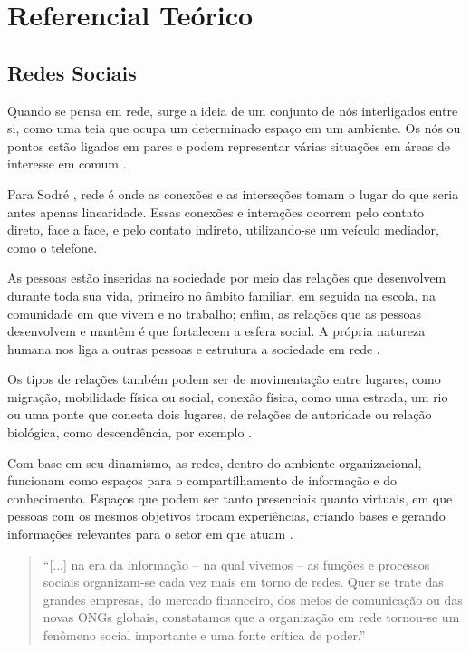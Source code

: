 \chapter{Referencial Teórico}

\section{Redes Sociais}

Quando se pensa em rede, surge a ideia de um conjunto de nós interligados entre si, como uma teia que ocupa um determinado espaço em um ambiente. Os nós ou pontos estão ligados em pares e podem representar várias situações em áreas de interesse em comum \cite{Newman:2010}.

Para Sodré \cite{Sodre:2002}, rede é onde as conexões e as interseções tomam o lugar do que seria antes apenas linearidade. Essas conexões e interações ocorrem pelo contato direto, face a face, e pelo contato indireto, utilizando-se um veículo mediador, como o telefone.

As pessoas estão inseridas na sociedade por meio das relações que desenvolvem durante toda sua vida, primeiro no âmbito familiar, em seguida na escola, na comunidade em que vivem e no trabalho; enfim, as relações que as pessoas desenvolvem e mantêm é que fortalecem a esfera social. A própria natureza humana nos liga a outras pessoas e estrutura a sociedade em rede \cite{Tomae:Alcara:Chiara:2005}.

Os tipos de relações também podem ser de movimentação entre lugares, como migração, mobilidade física ou social, conexão física, como uma estrada, um rio ou uma ponte que conecta dois lugares, de relações de autoridade ou relação biológica, como descendência, por exemplo \cite{Wasserman:1994}.

Com base em seu dinamismo, as redes, dentro do ambiente organizacional, funcionam como espaços para o compartilhamento de informação e do conhecimento. Espaços que podem ser tanto presenciais quanto virtuais, em que pessoas com os mesmos objetivos trocam experiências, criando bases e gerando informações relevantes para o setor em que atuam \cite{Tomae:Alcara:Chiara:2005}.

\begin{quote}
	``[...] na era da informação – na qual vivemos – as
	funções e processos sociais organizam-se cada vez
	mais em torno de redes. Quer se trate das grandes
	empresas, do mercado financeiro, dos meios de
	comunicação ou das novas ONGs globais,
	constatamos que a organização em rede tornou-se
	um fenômeno social importante e uma fonte crítica
	de poder.'' \cite{Capra:2002}
\end{quote}

